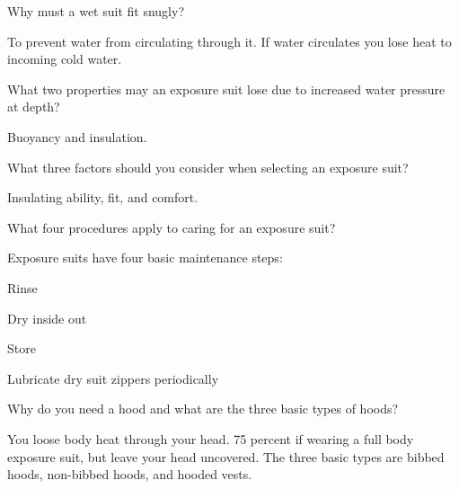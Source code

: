 	\begin{qanda}
		\begin{question}
Why must a wet suit fit snugly?
		\end{question}

		\begin{answer}
To prevent water from circulating through it.  If water circulates you lose heat to incoming cold water.
		\end{answer}
	\end{qanda}

	\begin{qanda}
		\begin{question}
What two properties may an exposure suit lose due to increased water pressure at depth?
		\end{question}

		\begin{answer}
Buoyancy and insulation.
		\end{answer}
	\end{qanda}

	\begin{qanda}
		\begin{question}
What three factors should you consider when selecting an exposure suit?
		\end{question}

		\begin{answer}
Insulating ability, fit, and comfort.
		\end{answer}
	\end{qanda}

	\begin{qanda}
		\begin{question}
What four procedures apply to caring for an exposure suit?
		\end{question}

		\begin{answer}
Exposure suits have four basic maintenance steps:
			\begin{nospacenumberedlist}
				\item Rinse
				\item Dry inside out
				\item Store
				\item Lubricate dry suit zippers periodically
			\end{nospacenumberedlist}
		\end{answer}
	\end{qanda}

	\begin{qanda}
		\begin{question}
Why do you need a hood and what are the three basic types of hoods?
		\end{question}

		\begin{answer}
You loose body heat through your head.  75 percent if wearing a full body exposure suit, but leave your head uncovered.  The three basic types are bibbed hoods, non-bibbed hoods, and hooded vests.
		\end{answer}
	\end{qanda}


